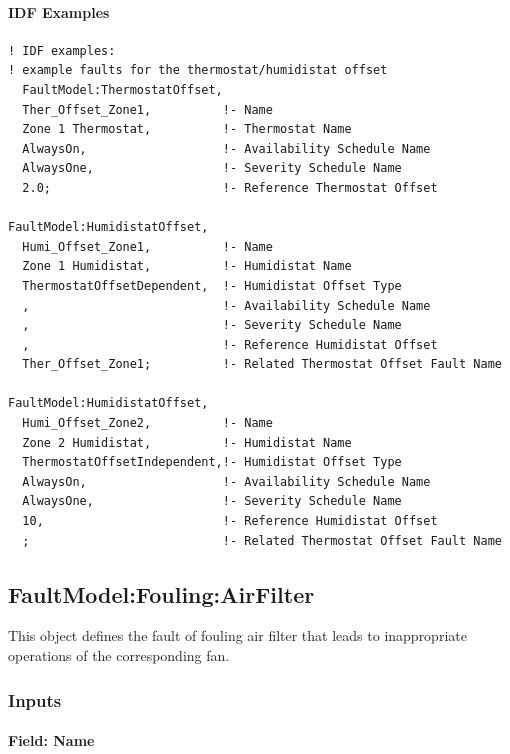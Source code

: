 \paragraph{IDF Examples}\label{an-example-of-idf-codes-for-the-thermostathumidistat-offset-fault-models}

\begin{lstlisting}
! IDF examples:
! example faults for the thermostat/humidistat offset
  FaultModel:ThermostatOffset,
  Ther_Offset_Zone1,          !- Name
  Zone 1 Thermostat,          !- Thermostat Name
  AlwaysOn,                   !- Availability Schedule Name
  AlwaysOne,                  !- Severity Schedule Name
  2.0;                        !- Reference Thermostat Offset

FaultModel:HumidistatOffset,
  Humi_Offset_Zone1,          !- Name
  Zone 1 Humidistat,          !- Humidistat Name
  ThermostatOffsetDependent,  !- Humidistat Offset Type
  ,                           !- Availability Schedule Name
  ,                           !- Severity Schedule Name
  ,                           !- Reference Humidistat Offset
  Ther_Offset_Zone1;          !- Related Thermostat Offset Fault Name

FaultModel:HumidistatOffset,
  Humi_Offset_Zone2,          !- Name
  Zone 2 Humidistat,          !- Humidistat Name
  ThermostatOffsetIndependent,!- Humidistat Offset Type
  AlwaysOn,                   !- Availability Schedule Name
  AlwaysOne,                  !- Severity Schedule Name
  10,                         !- Reference Humidistat Offset
  ;                           !- Related Thermostat Offset Fault Name
\end{lstlisting}

\subsection{FaultModel:Fouling:AirFilter}\label{faultmodelfoulingairfilter}

This object defines the fault of fouling air filter that leads to inappropriate operations of the corresponding fan.

\subsubsection{Inputs}\label{inputs-8-013}

\paragraph{Field: Name}\label{field-name-8-011}

